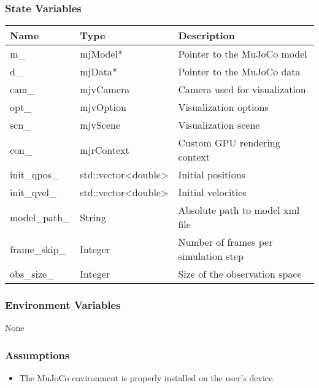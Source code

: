 \documentclass[12pt, titlepage]{article}
\begin{document}
\subsubsection{State Variables}

\begin{center}
  \begin{tabular}{p{4cm} p{4cm} p{4cm}}
    \hline
    \textbf{Name} & \textbf{Type} & \textbf{Description} \\
    \hline
    m\_ & mjModel* & Pointer to the MuJoCo model\\
    \hline
    d\_ & mjData* & Pointer to the MuJoCo data\\
    \hline
    cam\_ & mjvCamera & Camera used for visualization\\
    \hline
    opt\_ & mjvOption & Visualization options\\
    \hline
    scn\_ & mjvScene & Visualization scene\\
    \hline
    con\_ & mjrContext & Custom GPU rendering context\\
    \hline
    init\_qpos\_ & std::vector<double> & Initial positions\\
    \hline
    init\_qvel\_ & std::vector<double> & Initial velocities\\
    \hline
    model\_path\_ & String & Absolute path to model xml file\\
    \hline
    frame\_skip\_ & Integer & Number of frames per simulation step\\
    \hline
    obs\_size\_ & Integer & Size of the observation space\\
    \hline
  \end{tabular}
\end{center}

\subsubsection{Environment Variables}
None

\subsubsection{Assumptions}
\begin{itemize}
  \item The MuJoCo environment is properly installed on the user's device.
\end{itemize}
\end{document}

